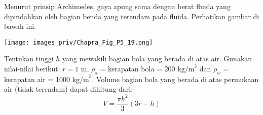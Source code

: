 \begin{soal}
Menurut prinsip Archimedes, gaya apung sama dengan berat fluida yang dipindahkan
oleh bagian benda yang terendam pada fluida.
Perhatikan gambar di bawah ini.

{\centering
\texttt{[image: images\_priv/Chapra\_Fig\_P5\_19.png]}
\par}

Tentukan tinggi $h$ yang mewakili bagian bola yang berada di atas air.
Gunakan nilai-nilai berikut: $r=1$ m, $\rho_{s}$ = kerapatan bola =
200 $\mathrm{kg/m}^{3}$ dan $\rho_{w}$ = kerapatan air = 1000 $\mathrm{kg/m}^{3}$.
Volume bagian bola yang berada di atas permukaan air (tidak terendam) dapat dihitung dari:
\begin{equation*}
V = \frac{\pi h^2}{3} (3r - h)
\end{equation*}
\end{soal}